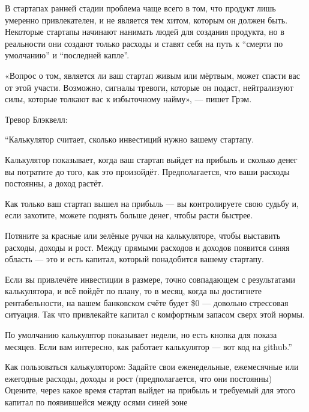 \documentclass[ebook,12pt,oneside,openany]{memoir}
\begin{document}
В стартапах ранней стадии проблема чаще всего в том, что продукт лишь
умеренно привлекателен, и не является тем хитом, которым он должен
быть. Некоторые стартапы начинают нанимать людей для создания
продукта, но в реальности они создают только расходы и ставят себя на
путь к “смерти по умолчанию” и “последней капле”.

«Вопрос о том, является ли ваш стартап живым или мёртвым, может спасти
вас от этой участи. Возможно, сигналы тревоги, которые он подаст,
нейтрализуют силы, которые толкают вас к избыточному найму», — пишет
Грэм.

Тревор Блэквелл:

“Калькулятор считает, сколько инвестиций нужно вашему стартапу.

Калькулятор показывает, когда ваш стартап выйдет на прибыль и сколько
денег вы потратите до того, как это произойдёт. Предполагается, что
ваши расходы постоянны, а доход растёт.

Как только ваш стартап вышел на прибыль — вы контролируете свою судьбу
и, если захотите, можете поднять больше денег, чтобы расти быстрее.

Потяните за красные или зелёные ручки на калькуляторе, чтобы выставить
расходы, доходы и рост. Между прямыми расходов и доходов появится
синяя область — это и есть капитал, который понадобится вашему
стартапу.

Если вы привлечёте инвестиции в размере, точно совпадающем с
результатами калькулятора, и всё пойдёт по плану, то в месяц, когда вы
достигнете рентабельности, на вашем банковском счёте будет \$0 —
довольно стрессовая ситуация. Так что привлекайте капитал с комфортным
запасом сверх этой нормы.

По умолчанию калькулятор показывает недели, но есть кнопка для показа
месяцев. Если вам интересно, как работает калькулятор — вот код на
github.”

Как пользоваться калькулятором: Задайте свои еженедельные, ежемесячные
или ежегодные расходы, доходы и рост (предполагается, что они
постоянны) Оцените, через какое время стартап выйдет на прибыль и
требуемый для этого капитал по появившейся между осями синей зоне
\end{document}
